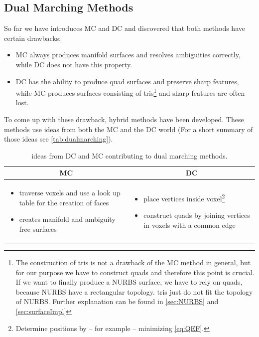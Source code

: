 \subsection{Dual Marching Methods}
So far we have introduces \ac{MC} and \ac{DC} and discovered that both methods have certain drawbacks:
\begin{itemize}
\item \ac{MC} always produces manifold surfaces and resolves ambiguities correctly, while \ac{DC} does not have this property.
\item \ac{DC} has the ability to produce \ac{quad} surfaces and preserve sharp features, while \ac{MC} produces surfaces consisting of \acp{tri}\footnote{The construction of \acp{tri} is not a drawback of the \ac{MC} method in general, but for our purpose we have to construct \acp{quad} and therefore this point is crucial. If we want to finally produce a \ac{NURBS} surface, we have to rely on \acp{quad}, because \ac{NURBS} have a rectangular topology. \Acp{tri} just do not fit the topology of \ac{NURBS}. Further explanation can be found in \autoref{sec:NURBS} and \autoref{sec:surfaceImpl}} and sharp features are often lost.
\end{itemize}
To come up with these drawback, hybrid methods have been developed. These methods use ideas from both the \ac{MC} and the \ac{DC} world (For a short summary of those ideas see \autoref{tab:dualmarching}).
\begin{table}[H]
\begin{tabularx}{\textwidth}{X|X}
\multicolumn{1}{c|}{\acl{MC}} 
    & \multicolumn{1}{c}{\acl{DC}} 
\\
\hline
\begin{itemize}[ topsep = 0pt, leftmargin=1em]
\item traverse voxels and use a look up table for the creation of faces
\item creates manifold and ambiguity free surfaces
\end{itemize}
&
\begin{itemize}[ topsep = 0pt, leftmargin=1em]
\item place vertices inside voxel\footnote{Determine positions by -- for example -- minimizing \autoref{eq:QEF}.}
\item construct \acp{quad} by joining vertices in voxels with a common edge
\end{itemize}
\end{tabularx}
\caption{ideas from \ac{DC} and \ac{MC} contributing to dual marching methods.}
\label{tab:dualmarching}
\end{table}

